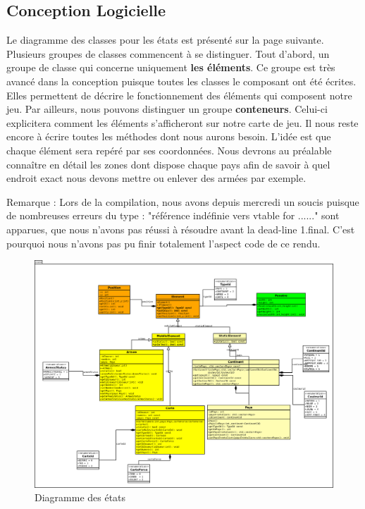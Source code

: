 \subsection{Conception Logicielle}
Le diagramme des classes pour les états est présenté sur la page suivante. Plusieurs groupes de classes commencent à se distinguer. 
Tout d'abord, un groupe de classe qui concerne uniquement \textbf{les éléments}. Ce groupe est très avancé dans la conception puisque toutes les classes le composant ont été écrites. Elles permettent de décrire le fonctionnement des éléments qui composent notre jeu. 
\newline 
\newline 
Par ailleurs, nous pouvons distinguer un groupe \textbf{conteneurs}. Celui-ci explicitera comment les éléments s'afficheront sur notre carte de jeu. Il nous reste encore à écrire toutes les méthodes dont nous aurons besoin. L'idée est que chaque élément sera repéré par ses coordonnées. Nous devrons au préalable connaître en détail les zones dont dispose chaque pays afin de savoir à quel endroit exact nous devons mettre ou enlever des armées par exemple.  

\newpage
Remarque : Lors de la compilation, nous avons depuis mercredi un soucis puisque de nombreuses erreurs du type : "référence indéfinie vers vtable for ......" sont apparues, que nous n'avons pas réussi à résoudre avant la dead-line 1.final. C'est pourquoi nous n'avons pas pu finir totalement l'aspect code de ce rendu. 
\newpage
\begin{landscape}
    \begin{figure}[!htbp]
        \centering
        \includegraphics[width=21cm]{Images/state.png}
        \caption{Diagramme des états}
        \label{fig:textures_plateau}
    \end{figure}
\end{landscape}